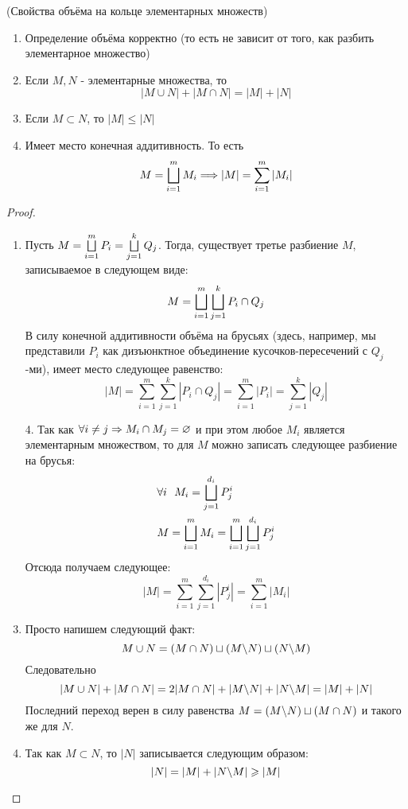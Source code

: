 \begin{theorem} (Свойства объёма на кольце элементарных множеств)
	\begin{enumerate}
		\item Определение объёма корректно (то есть не зависит от того, как разбить элементарное множество)
		
		\item Если $M, N$ - элементарные множества, то
		\[
			|M \cup N| + |M \cap N| = |M| + |N|
		\]
		
		\item Если $M \subset N$, то $|M| \le |N|$
		
		\item Имеет место конечная аддитивность. То есть
		\[
			M = \bigsqcup\limits_{i = 1}^m M_i \Longrightarrow |M| = \sum\limits_{i = 1}^m |M_i|
		\]
	\end{enumerate}
\end{theorem}

\begin{proof}~
	\begin{enumerate}
		\item Пусть \(M = \bigsqcup\limits_{i = 1}^m P_i = \bigsqcup\limits_{j = 1}^k Q_j\). Тогда, существует третье разбиение $M$, записываемое в следующем виде:
		\[
			M = \bigsqcup\limits_{i = 1}^m \bigsqcup\limits_{j = 1}^k P_i \cap Q_j
		\]
		В силу конечной аддитивности объёма на брусьях (здесь, например, мы представили $P_i$ как дизъюнктное объединение кусочков-пересечений с $Q_j$-ми), имеет место следующее равенство:
		\[
			|M| = \sum_{i = 1}^m \sum_{j = 1}^k |P_i \cap Q_j| = \sum_{i = 1}^m |P_i| = \sum_{j = 1}^k |Q_j|
		\]
		
		\item[4.] Так как $\forall i \neq j \Rightarrow M_i \cap M_j = \varnothing$ и при этом любое $M_i$ является элементарным множеством, то для $M$ можно записать следующее разбиение на брусья:
		\begin{align*}
			&{\forall i\ \ M_i = \bigsqcup\limits_{j = 1}^{d_i} P_j^i}
			\\
			&{M = \bigsqcup\limits_{i = 1}^m M_i = \bigsqcup\limits_{i = 1}^m \bigsqcup\limits_{j = 1}^{d_i} P_j^i}
		\end{align*}
		Отсюда получаем следующее:
		\[
			|M| = \sum_{i = 1}^m \sum_{j = 1}^{d_i} |P_j^i| = \sum_{i = 1}^m |M_i|
		\]
		
		\item Просто напишем следующий факт:
		\[
			M \cup N = (M \cap N) \sqcup (M \backslash N) \sqcup (N \backslash M)
		\]
		Следовательно
		\[
			|M \cup N| + |M \cap N| = 2|M \cap N| + |M \backslash N| + |N \backslash M| = |M| + |N|
		\]
		Последний переход верен в силу равенства $M = (M \backslash N) \sqcup (M \cap N)$ и такого же для $N$.
		
		\item Так как $M \subset N$, то $|N|$ записывается следующим образом:
		\[
			|N| = |M| + |N \backslash M| \geqslant |M|
		\]
	\end{enumerate}
\end{proof}

